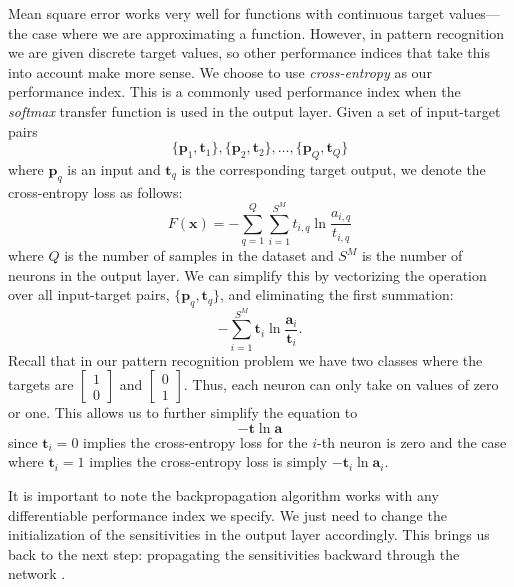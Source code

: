 \documentclass[12pt,halfline,a4paper]{ouparticle}
\begin{document}
Mean square error works very well for functions with continuous target values---the case where we are approximating a function. However, in pattern recognition we are given discrete target values, so other performance indices that take this into account make more sense. We choose to use \emph{cross-entropy} as our performance index. This is a commonly used performance index when the \emph{softmax} transfer function is used in the output layer. Given a set of input-target pairs 
\begin{equation}
\{\mathbf{p}_{1}, \mathbf{t}_{1}\}, \{\mathbf{p}_{2}, \mathbf{t}_{2}\}, \ldots, \{\mathbf{p}_{Q}, \mathbf{t}_{Q}\}
\end{equation}
where $\mathbf{p}_{q}$ is an input and $\mathbf{t}_{q}$ is the corresponding target output, we denote the cross-entropy loss as follows: 
\begin{equation}
F(\mathbf{x}) = - \sum_{q = 1}^{Q} \sum_{i = 1}^{S^{M}} t_{i, q} \ln \frac{a_{i, q}}{t_{i, q}}
\end{equation}
where $Q$ is the number of samples in the dataset and $S^{M}$ is the number of neurons in the output layer. We can simplify this by vectorizing the operation over all input-target pairs, $\{\mathbf{p}_{q}, \mathbf{t}_{q}\}$, and eliminating the first summation: 
\begin{equation}
- \sum_{i = 1}^{S^{M}} \mathbf{t}_{i} \ln \frac{\mathbf{a}_{i}}{\mathbf{t}_{i}}.
\end{equation}
Recall that in our pattern recognition problem we have two classes where the targets are $\begin{bmatrix} 1 \\ 0 \end{bmatrix}$ and $\begin{bmatrix} 0 \\ 1 \end{bmatrix}$. Thus, each neuron can only take on values of zero or one. This allows us to further simplify the equation to 
\begin{equation}
- \mathbf{t} \ln \mathbf{a}
\end{equation}
since $\mathbf{t}_{i} = 0$ implies the cross-entropy loss for the $i$-th neuron is zero and the case where 
$\mathbf{t}_{i} = 1$ implies the cross-entropy loss is simply $ - \mathbf{t}_{i} \ln \mathbf{a}_{i}$.  

It is important to note the backpropagation algorithm works with any differentiable performance index we specify. We just need to change the initialization of the sensitivities in the output layer accordingly. This brings us back to the next step: propagating the sensitivities backward through the network \cite{hagan2014}.
\end{document}
